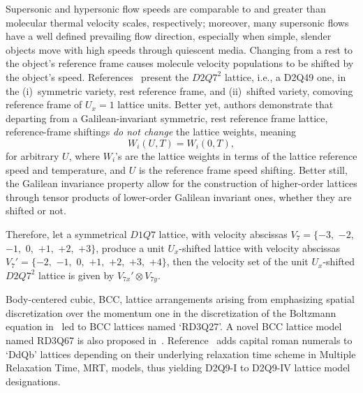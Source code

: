     Supersonic and hypersonic flow speeds are comparable to and greater than molecular thermal  velocity  scales,  respectively;
    moreover, many supersonic flows have a well defined prevailing flow direction, especially when simple, slender objects  move
    with high speeds through quiescent media. Changing from a rest to the object's  reference  frame  causes  molecule  velocity
    populations   to   be    shifted    by    the    object's    speed.    References~\cite{2016-FrapolliN+KarlinIV-PhysRevLett,
    2020-FrapolliN+KarlinIV-Entropy} present the $D2Q7^2$ lattice, i.e., a D2Q49 one,  in  the  (i)~symmetric  variety,
    rest reference frame, and (ii)~shifted variety, comoving reference frame of $U_x = 1$ lattice  units.  Better  yet,  authors
    demonstrate that departing from a Galilean-invariant symmetric, rest  reference  frame  lattice,  reference-frame  shiftings
    \emph{do not change} the lattice weights, meaning%
    \begin{equation}
        W_i(U, T) = W_i(0, T),
    \end{equation}
    \noindent for arbitrary $U$, where $W_i$'s are the lattice weights in terms of the lattice reference speed and  temperature,
    and $U$ is the reference frame speed shifting. Better still, the Galilean invariance property allow for the construction  of
    higher-order lattices through tensor products of lower-order Galilean invariant ones, whether they are shifted or not.

    Therefore, let a symmetrical $D1Q7$ lattice, with velocity abscissas $V_7 = \{-3,$ $-2,$  $-1,$  $0,$  $+1,$  $+2,$  $+3\}$,
    produce a unit $U_x$-shifted lattice with velocity abscissas $V_7' = \{-2,$ $-1,$ $0,$ $+1,$ $+2,$ $+3,$  $+4\}$,  then  the
    velocity set of the unit $U_x$-shifted $D2Q7^2$ lattice is given by $V_{7x}' \otimes V_{7y}$.

    Body-centered cubic, BCC, lattice arrangements arising from emphasizing spatial discretization over the momentum one in  the
    discretization of the Boltzmann equation in~\cite{2016-NamburiM+AnsumaliS-SciRep} led to  BCC  lattices  named  `RD3Q27'.  A
    novel    BCC    lattice    model    named    RD3Q67    is     also     proposed     in~\cite{2018-AtifM+AnsumaliS-PhysRevE}.
    Reference~\cite{2017-LiL+KlausnerJF-IntJHeatMassTran} adds capital roman numerals to  `DdQb'  lattices  depending  on  their
    underlying relaxation time scheme in Multiple Relaxation Time, MRT, models, thus yielding D2Q9-I to  D2Q9-IV  lattice  model
    designations.

